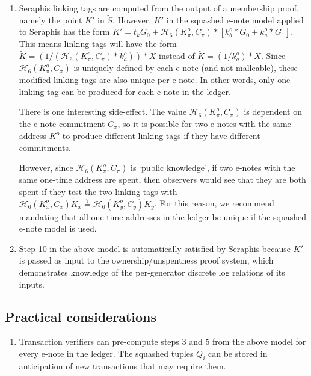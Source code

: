 \begin{appendices}
\begin{enumerate}
\begin{enumerate}
        [[[formal proof? this is giving me a lot of trouble]]]
    \end{enumerate}

    \item Seraphis linking tags are computed from the output of a membership proof, namely the point $K'$ in $\tilde{S}$. However, $K'$ in the squashed e-note model applied to Seraphis has the form $K' = t_k G_0 + \mathcal{H}_6(K^o_{\pi}, C_{\pi})*[k^o_b*G_0 + k^o_a*G_1]$. This means linking tags will have the form $\tilde{K} = (1/(\mathcal{H}_6(K^o_{\pi}, C_{\pi})*k^o_a))*X$ instead of $\tilde{K} = (1/k^o_a)*X$. Since $\mathcal{H}_6(K^o_{\pi}, C_{\pi})$ is uniquely defined by each e-note (and not malleable), these modified linking tags are also unique per e-note. In other words, only one linking tag can be produced for each e-note in the ledger.

    There is one interesting side-effect. The value $\mathcal{H}_6(K^o_{\pi}, C_{\pi})$ is dependent on the e-note commitment $C_{\pi}$, so it is possible for two e-notes with the same address $K^o$ to produce different linking tags if they have different commitments.

    However, since $\mathcal{H}_6(K^o_{\pi}, C_{\pi})$ is `public knowledge', if two e-notes with the same one-time address are spent, then observers would see that they are both spent if they test the two linking tags with $\mathcal{H}_6(K^o_{x}, C_{x})\tilde{K}_x \stackrel{?}{=} \mathcal{H}_6(K^o_{y}, C_{y})\tilde{K}_y$. For this reason, we recommend mandating that all one-time addresses in the ledger be unique if the squashed e-note model is used.

    \item Step 10 in the above model is automatically satisfied by Seraphis because $K'$ is passed as input to the ownership/unspentness proof system, which demonstrates knowledge of the per-generator discrete log relations of its inputs.
\end{enumerate}


\subsection{Practical considerations}
\label{appendix:squashed-e-note-model-practical-considerations}

\begin{enumerate}
    \item Transaction verifiers can pre-compute steps 3 and 5 from the above model for every e-note in the ledger. The squashed tuples $Q_i$ can be stored in anticipation of new transactions that may require them.


\end{enumerate}
\end{appendices}
